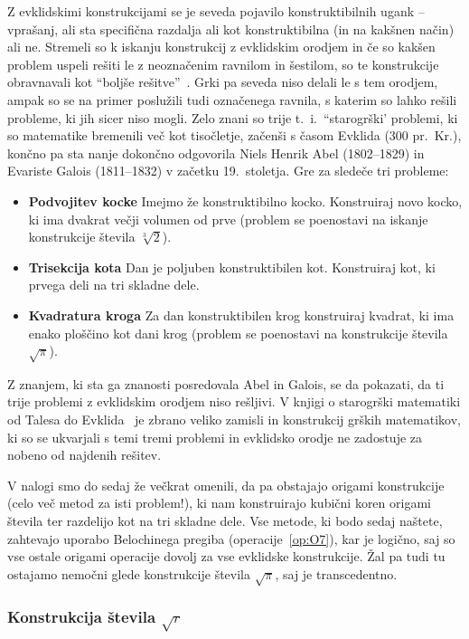 Z evklidskimi konstrukcijami se je seveda pojavilo konstruktibilnih ugank -- vprašanj, ali sta specifična razdalja ali kot konstruktibilna (in na kakšnen način) ali ne. Stremeli so k iskanju konstrukcij z evklidskim orodjem in če so kakšen problem uspeli rešiti le z neoznačenim ravnilom in šestilom, so te konstrukcije obravnavali kot ``boljše rešitve''~\cite[str. 36]{royster2002}. Grki pa seveda niso delali le s tem orodjem, ampak so se na primer poslužili tudi označenega ravnila, s katerim so lahko rešili probleme, ki jih sicer niso mogli. Zelo znani so trije t.\ i.\ ``starogrški' problemi, ki so matematike bremenili več kot tisočletje, začenši s časom Evklida (300 pr.\ Kr.), končno pa sta nanje dokončno odgovorila Niels Henrik Abel (1802--1829) in Evariste Galois (1811--1832) v začetku 19.\ stoletja. Gre za sledeče tri probleme:
\begin{itemize}
    \item \textbf{Podvojitev kocke} Imejmo že konstruktibilno kocko. Konstruiraj novo kocko, ki ima dvakrat večji volumen od prve (problem se poenostavi na iskanje konstrukcije števila $\sqrt[3]{2}$).
    \item \textbf{Trisekcija kota} Dan je poljuben konstruktibilen kot. Konstruiraj kot, ki prvega deli na tri skladne dele.
    \item \textbf{Kvadratura kroga} Za dan konstruktibilen krog konstruiraj kvadrat, ki ima enako ploščino kot dani krog (problem se poenostavi na konstrukcije števila $\sqrt{\pi}$).
\end{itemize}

Z znanjem, ki sta ga znanosti posredovala Abel in Galois, se da pokazati, da ti trije problemi z evklidskim orodjem niso rešljivi. V knjigi o starogrški matematiki od Talesa do Evklida~\cite[str.\ 218--270]{heath1921} je zbrano veliko zamisli in konstrukcij grških matematikov, ki so se ukvarjali s temi tremi problemi in evklidsko orodje ne zadostuje za nobeno od najdenih rešitev.

V nalogi smo do sedaj že večkrat omenili, da pa obstajajo origami konstrukcije (celo več metod za isti problem!), ki nam konstruirajo kubični koren origami števila ter razdelijo kot na tri skladne dele. Vse metode, ki bodo sedaj naštete, zahtevajo uporabo Belochinega pregiba (operacije~\ref{op:O7}), kar je logično, saj so vse ostale origami operacije dovolj za vse evklidske konstrukcije. Žal pa tudi tu ostajamo nemočni glede konstrukcije števila $\sqrt{\pi}$, saj je transcedentno.

\subsubsection*{Konstrukcija števila $\sqrt{r}$}

